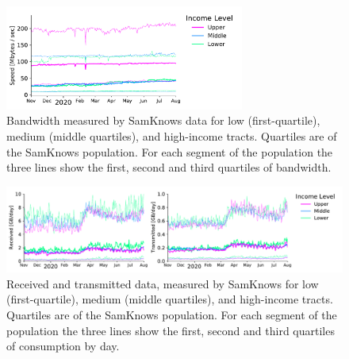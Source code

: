 \documentclass[11 pt]{amsart}
\begin{document}
\begin{figure}[]
\centering
\includegraphics[width=0.7\textwidth]{sk_bandwidth.pdf}
\caption{Bandwidth measured by SamKnows data for low (first-quartile), medium (middle quartiles), and high-income tracts. Quartiles are of the SamKnows population. For each segment of the population the three lines show the first, second and third quartiles of bandwidth.}
\end{figure}

\begin{figure}[]
\centering
\includegraphics[width=1.0\textwidth]{sk_consumption.pdf}
\caption{Received and transmitted data, measured by SamKnows for low (first-quartile), medium (middle quartiles), and high-income tracts.  Quartiles are of the SamKnows population.  For each segment of the population the three lines show the first, second and third quartiles of consumption by day.}
\end{figure}






\end{document}
